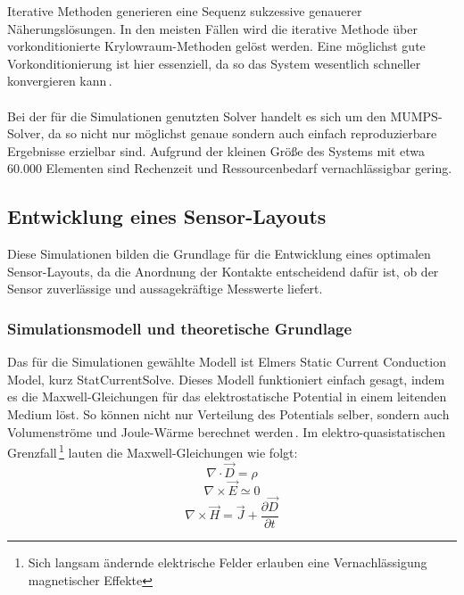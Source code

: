 \documentclass[12pt, a4paper]{article}
\begin{document}
Iterative Methoden generieren eine Sequenz sukzessive genauerer Näherungslösungen. In den meisten Fällen wird die iterative Methode über vorkonditionierte Krylowraum-Methoden gelöst werden. Eine möglichst gute Vorkonditionierung ist hier essenziell, da so das System wesentlich schneller konvergieren kann\,\cite{elmerSolve}.\paragraph{}

Bei der für die Simulationen genutzten Solver handelt es sich um den MUMPS-Solver, da so nicht nur möglichst genaue sondern auch einfach reproduzierbare Ergebnisse erzielbar sind. Aufgrund der kleinen Größe des Systems mit etwa 60.000 Elementen sind Rechenzeit und Ressourcenbedarf vernachlässigbar gering. 




\subsection{Entwicklung eines Sensor-Layouts}
Diese Simulationen bilden die Grundlage für die Entwicklung eines optimalen Sensor-Layouts, da die Anordnung der Kontakte entscheidend dafür ist, ob der Sensor zuverlässige und aussagekräftige Messwerte liefert.
\subsubsection{Simulationsmodell und theoretische Grundlage}
Das für die Simulationen gewählte Modell ist Elmers Static Current Conduction Model, kurz StatCurrentSolve.\newline 
Dieses Modell funktioniert einfach gesagt, indem es die Maxwell-Gleichungen für das elektrostatische Potential in einem leitenden Medium löst. So können nicht nur Verteilung des Potentials selber, sondern auch Volumenströme und Joule-Wärme berechnet werden\,\cite{elmerModel}.\newline
Im elektro-quasistatischen Grenzfall\,\footnote{Sich langsam ändernde elektrische Felder erlauben eine Vernachlässigung magnetischer Effekte} lauten die Maxwell-Gleichungen wie folgt:
\begin{equation}
	\nabla\cdot\vec{D}=\rho
	\tag{4.1}
	\label{4.1}
\end{equation}
\begin{equation}
	\nabla\times\vec{E}\simeq0
	\tag{4.2}
	\label{4.2}
\end{equation}
\begin{equation}
	\nabla\times\vec{H}=\vec{J}+\frac{\partial\vec{D}}{\partial{t}}
	\tag{4.3}
	\label{4.3}
\end{equation}
\end{document}
